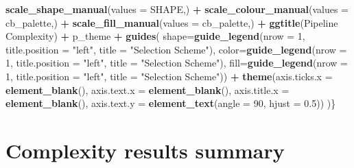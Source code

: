 \documentclass[
]{book}
\newenvironment{Shaded}{\begin{snugshade}}{\end{snugshade}}
\newcommand{\AttributeTok}[1]{\textcolor[rgb]{0.13,0.29,0.53}{#1}}
\newcommand{\DecValTok}[1]{\textcolor[rgb]{0.00,0.00,0.81}{#1}}
\newcommand{\FloatTok}[1]{\textcolor[rgb]{0.00,0.00,0.81}{#1}}
\newcommand{\FunctionTok}[1]{\textcolor[rgb]{0.13,0.29,0.53}{\textbf{#1}}}
\newcommand{\NormalTok}[1]{#1}
\newcommand{\SpecialCharTok}[1]{\textcolor[rgb]{0.81,0.36,0.00}{\textbf{#1}}}
\newcommand{\StringTok}[1]{\textcolor[rgb]{0.31,0.60,0.02}{#1}}
\begin{document}
\begin{Shaded}
\begin{Highlighting}[]
    \FunctionTok{scale\_shape\_manual}\NormalTok{(}\AttributeTok{values =}\NormalTok{ SHAPE,) }\SpecialCharTok{+}
    \FunctionTok{scale\_colour\_manual}\NormalTok{(}\AttributeTok{values =}\NormalTok{ cb\_palette,) }\SpecialCharTok{+}
    \FunctionTok{scale\_fill\_manual}\NormalTok{(}\AttributeTok{values =}\NormalTok{ cb\_palette,) }\SpecialCharTok{+}
    \FunctionTok{ggtitle}\NormalTok{(}\StringTok{\textquotesingle{}Pipeline Complexity\textquotesingle{}}\NormalTok{) }\SpecialCharTok{+}
\NormalTok{    p\_theme }\SpecialCharTok{+}
    \FunctionTok{guides}\NormalTok{(}
    \AttributeTok{shape=}\FunctionTok{guide\_legend}\NormalTok{(}\AttributeTok{nrow =} \DecValTok{1}\NormalTok{, }\AttributeTok{title.position =} \StringTok{"left"}\NormalTok{,}
                        \AttributeTok{title =} \StringTok{"Selection Scheme"}\NormalTok{),}
    \AttributeTok{color=}\FunctionTok{guide\_legend}\NormalTok{(}\AttributeTok{nrow =} \DecValTok{1}\NormalTok{, }\AttributeTok{title.position =} \StringTok{"left"}\NormalTok{,}
                        \AttributeTok{title =} \StringTok{"Selection Scheme"}\NormalTok{),}
    \AttributeTok{fill=}\FunctionTok{guide\_legend}\NormalTok{(}\AttributeTok{nrow =} \DecValTok{1}\NormalTok{, }\AttributeTok{title.position =} \StringTok{"left"}\NormalTok{,}
                        \AttributeTok{title =} \StringTok{"Selection Scheme"}\NormalTok{)) }\SpecialCharTok{+}
    \FunctionTok{theme}\NormalTok{(}\AttributeTok{axis.ticks.x =} \FunctionTok{element\_blank}\NormalTok{(),}
            \AttributeTok{axis.text.x =} \FunctionTok{element\_blank}\NormalTok{(),}
            \AttributeTok{axis.title.x =} \FunctionTok{element\_blank}\NormalTok{(),}
            \AttributeTok{axis.text.y =} \FunctionTok{element\_text}\NormalTok{(}\AttributeTok{angle =} \DecValTok{90}\NormalTok{, }\AttributeTok{hjust =} \FloatTok{0.5}\NormalTok{))}
\NormalTok{)\}}
\end{Highlighting}
\end{Shaded}

\hypertarget{complexity-results-summary}{%
\section{Complexity results summary}\label{complexity-results-summary}}
\end{document}
